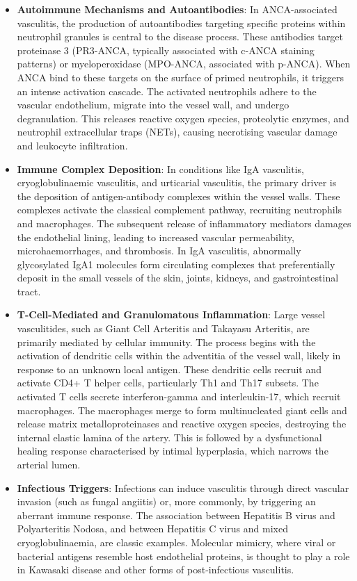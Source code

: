 \begin{itemize}
\item \textbf{Autoimmune Mechanisms and Autoantibodies}: In ANCA-associated vasculitis, the production of autoantibodies targeting specific proteins within neutrophil granules is central to the disease process. These antibodies target proteinase 3 (PR3-ANCA, typically associated with c-ANCA staining patterns) or myeloperoxidase (MPO-ANCA, associated with p-ANCA). When ANCA bind to these targets on the surface of primed neutrophils, it triggers an intense activation cascade. The activated neutrophils adhere to the vascular endothelium, migrate into the vessel wall, and undergo degranulation. This releases reactive oxygen species, proteolytic enzymes, and neutrophil extracellular traps (NETs), causing necrotising vascular damage and leukocyte infiltration.
\item \textbf{Immune Complex Deposition}: In conditions like IgA vasculitis, cryoglobulinaemic vasculitis, and urticarial vasculitis, the primary driver is the deposition of antigen-antibody complexes within the vessel walls. These complexes activate the classical complement pathway, recruiting neutrophils and macrophages. The subsequent release of inflammatory mediators damages the endothelial lining, leading to increased vascular permeability, microhaemorrhages, and thrombosis. In IgA vasculitis, abnormally glycosylated IgA1 molecules form circulating complexes that preferentially deposit in the small vessels of the skin, joints, kidneys, and gastrointestinal tract.
\item \textbf{T-Cell-Mediated and Granulomatous Inflammation}: Large vessel vasculitides, such as Giant Cell Arteritis and Takayasu Arteritis, are primarily mediated by cellular immunity. The process begins with the activation of dendritic cells within the adventitia of the vessel wall, likely in response to an unknown local antigen. These dendritic cells recruit and activate CD4+ T helper cells, particularly Th1 and Th17 subsets. The activated T cells secrete interferon-gamma and interleukin-17, which recruit macrophages. The macrophages merge to form multinucleated giant cells and release matrix metalloproteinases and reactive oxygen species, destroying the internal elastic lamina of the artery. This is followed by a dysfunctional healing response characterised by intimal hyperplasia, which narrows the arterial lumen.
\item \textbf{Infectious Triggers}: Infections can induce vasculitis through direct vascular invasion (such as fungal angiitis) or, more commonly, by triggering an aberrant immune response. The association between Hepatitis B virus and Polyarteritis Nodosa, and between Hepatitis C virus and mixed cryoglobulinaemia, are classic examples. Molecular mimicry, where viral or bacterial antigens resemble host endothelial proteins, is thought to play a role in Kawasaki disease and other forms of post-infectious vasculitis.

\end{itemize}
